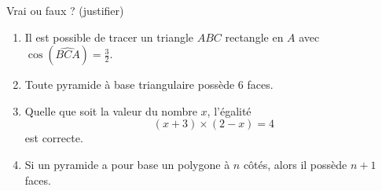 
\begin{exercice}\label{exo2smath-0245}

    Vrai ou faux ? (justifier)
    \begin{enumerate}
        \item
            Il est possible de tracer un triangle \( ABC\) rectangle en \( A\) avec \( \cos(\widehat{BCA})=\frac{ 3 }{ 2 }\).
        \item
            Toute pyramide à base triangulaire possède \( 6\) faces.
        \item
            Quelle que soit la valeur du nombre \( x\), l'égalité 
            \begin{equation}
                (x+3)\times (2-x)=4
            \end{equation}
            est correcte.
        \item
            Si un pyramide a pour base un polygone à \( n\) côtés, alors il possède \( n+1\) faces.
    \end{enumerate}

\end{exercice}
